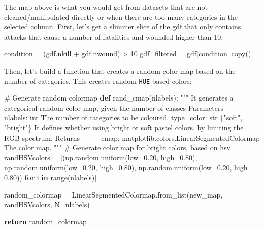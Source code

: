 \documentclass[
  letterpaper,
  DIV=11,
  numbers=noendperiod]{scrreprt}
\newenvironment{Shaded}{\begin{snugshade}}{\end{snugshade}}
\newcommand{\BuiltInTok}[1]{\textcolor[rgb]{0.00,0.23,0.31}{#1}}
\newcommand{\CommentTok}[1]{\textcolor[rgb]{0.37,0.37,0.37}{#1}}
\newcommand{\ControlFlowTok}[1]{\textcolor[rgb]{0.00,0.23,0.31}{\textbf{#1}}}
\newcommand{\DecValTok}[1]{\textcolor[rgb]{0.68,0.00,0.00}{#1}}
\newcommand{\FloatTok}[1]{\textcolor[rgb]{0.68,0.00,0.00}{#1}}
\newcommand{\KeywordTok}[1]{\textcolor[rgb]{0.00,0.23,0.31}{\textbf{#1}}}
\newcommand{\NormalTok}[1]{\textcolor[rgb]{0.00,0.23,0.31}{#1}}
\newcommand{\OperatorTok}[1]{\textcolor[rgb]{0.37,0.37,0.37}{#1}}
\newcommand{\StringTok}[1]{\textcolor[rgb]{0.13,0.47,0.30}{#1}}
\begin{document}
The map above is what you would get from datasets that are not
cleaned/manipulated directly or when there are too many categories in
the selected column. First, let's get a slimmer slice of the gdf that
only contains attacks that cause a number of fatalities and wounded
higher than 10.

\begin{Shaded}
\begin{Highlighting}[]
\NormalTok{condition }\OperatorTok{=}\NormalTok{ (gdf.nkill }\OperatorTok{+}\NormalTok{ gdf.nwound) }\OperatorTok{\textgreater{}} \DecValTok{10}
\NormalTok{gdf\_filtered }\OperatorTok{=}\NormalTok{ gdf[condition].copy()}
\end{Highlighting}
\end{Shaded}

Then, let's build a function that creates a random color map based on
the number of categories. This creates random \texttt{HUE}-based colors:

\begin{Shaded}
\begin{Highlighting}[]
\CommentTok{\# Generate random colormap}
\KeywordTok{def}\NormalTok{ rand\_cmap(nlabels):}
    \CommentTok{""" }
\CommentTok{    It generates a categorical random color map, given the number of classes}
\CommentTok{    }
\CommentTok{    Parameters}
\CommentTok{    {-}{-}{-}{-}{-}{-}{-}{-}{-}{-}}
\CommentTok{    nlabels: int}
\CommentTok{        The number of categories to be coloured.}
\CommentTok{    type\_color: str \{"soft", "bright"\} }
\CommentTok{        It defines whether using bright or soft pastel colors, by limiting the RGB spectrum.}
\CommentTok{       }
\CommentTok{    Returns}
\CommentTok{    {-}{-}{-}{-}{-}{-}{-}}
\CommentTok{    cmap: matplotlib.colors.LinearSegmentedColormap}
\CommentTok{        The color map.}
\CommentTok{    """}   
    \CommentTok{\# Generate color map for bright colors, based on hsv}
\NormalTok{    randHSVcolors }\OperatorTok{=}\NormalTok{ [(np.random.uniform(low}\OperatorTok{=}\FloatTok{0.20}\NormalTok{, high}\OperatorTok{=}\FloatTok{0.80}\NormalTok{),}
\NormalTok{                          np.random.uniform(low}\OperatorTok{=}\FloatTok{0.20}\NormalTok{, high}\OperatorTok{=}\FloatTok{0.80}\NormalTok{),}
\NormalTok{                          np.random.uniform(low}\OperatorTok{=}\FloatTok{0.20}\NormalTok{, high}\OperatorTok{=} \FloatTok{0.80}\NormalTok{)) }\ControlFlowTok{for}\NormalTok{ i }\KeywordTok{in} \BuiltInTok{range}\NormalTok{(nlabels)]}

\NormalTok{    random\_colormap }\OperatorTok{=}\NormalTok{ LinearSegmentedColormap.from\_list(}\StringTok{\textquotesingle{}new\_map\textquotesingle{}}\NormalTok{, randHSVcolors, N}\OperatorTok{=}\NormalTok{nlabels)}
   
    \ControlFlowTok{return}\NormalTok{ random\_colormap }
\end{Highlighting}
\end{Shaded}
\end{document}
